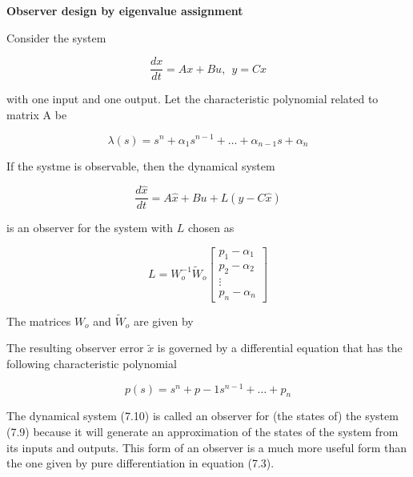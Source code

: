 \begin{framed}
\theoremstyle{theorem}
\begin{theorem}{\textbf{Observer design by eigenvalue assignment}}


Consider the system

\begin{equation}
\frac{dx}{dt} = Ax + Bu, ~~ y =Cx   \nonumber
\end{equation} 

with one input and one output. Let the characteristic polynomial related to matrix A be

\begin{equation}
\lambda(s) = s^n + \alpha_1 s^{n-1} + \ldots + \alpha_{n-1}s + \alpha_n \nonumber
\end{equation}

If the systme is observable, then the dynamical system

\begin{equation}
\frac{d \hat{x}}{dt} = A\hat{x} + Bu + L(y- C \hat{x})  \nonumber
\end{equation}


is an observer for the system with $L$ chosen as 

\begin{equation}
L = W_{o}^{-1}\tilde{W}_o
\begin{bmatrix}
 p_1 - \alpha_1 \\
 p_2 - \alpha_2 \\
 \vdots  \\
 p_n - \alpha_n
\end{bmatrix} \nonumber
\end{equation}

The matrices $W_{o}$ and $\tilde{W}_{o}$ are given by

The resulting observer error $\tilde{x}$ is governed by a differential equation that has the following characteristic polynomial

\begin{equation}
p(s) = s^n +  p-1 s^{n-1} + \ldots + p_n  \nonumber
\end{equation}
\end{theorem}
\end{framed}

The dynamical system (7.10) is called an observer for (the states of) the system (7.9) because it will generate an approximation of the states of the system from its inputs and outputs. This form of an observer is a much more useful form than the one given by pure differentiation in equation (7.3).



